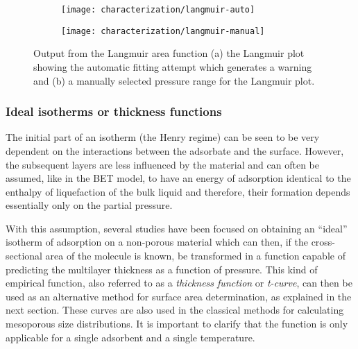 \begin{figure}[!htb]
	\centering

	\begin{subfigure}{0.45\linewidth}
		\parbox[c]{0.1\linewidth}{\caption{}%
			\label{pyg:fgr:langmuirarea-auto}}
		\parbox[b]{0.85\linewidth}{%
			\texttt{[image: characterization/langmuir-auto]}}
	\end{subfigure}
	\begin{subfigure}{0.45\linewidth}
		\parbox[c]{0.1\linewidth}{\caption{}%
			\label{pyg:fgr:langmuirarea-manual}}
		\parbox[b]{0.85\linewidth}{%
			\texttt{[image: characterization/langmuir-manual]}}
	\end{subfigure}

	\caption{Output from the Langmuir area function (a) the Langmuir plot
		showing the automatic fitting attempt which generates a warning and (b) a manually
		selected pressure range for the Langmuir plot.}%
	\label{pyg:fgr:langmuirarea}

\end{figure}

\subsubsection{Ideal isotherms or thickness functions}\label{pyg:charac:tcurve}

The initial part of an isotherm (the Henry regime) can be seen to
be very dependent on the interactions between the adsorbate and the
surface. However, the subsequent layers are less influenced by the
material and can often be assumed, like in the BET model,
to have an energy of adsorption identical to the enthalpy of liquefaction
of the bulk liquid and therefore, their formation depends essentially
only on the partial pressure.

With this assumption, several studies have been focused on obtaining
an ``ideal'' isotherm of adsorption on a non-porous material which can
then, if the cross-sectional area of the molecule is known, be transformed
in a function capable of predicting the multilayer thickness
as a function of pressure. This kind of empirical function,
also referred to as a \textit{thickness function} or \textit{t-curve},
can then be used as an
alternative method for surface area determination, as explained in
the next section. These curves are also used in the classical methods
for calculating mesoporous size distributions. It is important to
clarify that the function is only applicable for a single adsorbent
and a single temperature.

